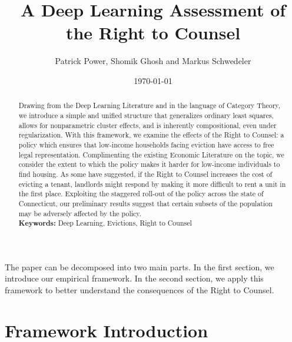 \documentclass[a4paper,12pt]{article}
\begin{document}
\begin{titlepage}
\title{A Deep Learning Assessment of the Right to Counsel}

\author{Patrick Power, Shomik Ghosh and Markus Schwedeler}
\date{\today}
\maketitle
\thispagestyle{empty} %
\vspace{-2em}
\begin{abstract}
Drawing from the Deep Learning Literature and in the language of Category Theory, we introduce a simple and unified structure that generalizes ordinary least squares, allows for nonparametric cluster effects, and is inherently compositional, even under regularization. With this framework, we examine the effects of the Right to Counsel: a policy which ensures that low-income households facing eviction have access to free legal representation. Complimenting the existing Economic Literature on the topic, we consider the extent to which the policy makes it harder for low-income individuals to find housing. As some have suggested, if the Right to Counsel increases the cost of evicting a tenant, landlords might respond by making it more difficult to rent a unit in the first place. Exploiting the staggered roll-out of the policy across the state of Connecticut, our preliminary results suggest that certain subsets of the population may be adversely affected by the policy. 
\vspace{0.2in}\\
\noindent\textbf{Keywords:} Deep Learning, Evictions, Right to Counsel\\
\end{abstract}
\setcounter{page}{1}
\end{titlepage}




The paper can be decomposed into two main parts. In the first section, we introduce our empirical framework. In the second section, we apply this framework to better understand the consequences of the Right to Counsel. 
\section{Framework Introduction}
\end{document}
